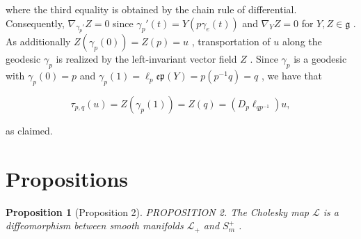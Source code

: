 \documentclass[11pt]{article}
\newtheorem{proposition}{Proposition}
\begin{document}
where the third equality is obtained by the chain rule of differential. Consequently,  $\nabla_{\gamma_p'}Z = 0$  since  $\gamma_p'(t) = Y(p\gamma_e(t))$  and  $\nabla_Y Z = 0$  for  $Y,Z\in \mathfrak{g}$ . As additionally  $Z(\gamma_p(0)) = Z(p) = u$ , transportation of  $u$  along the geodesic  $\gamma_{p}$  is realized by the left-invariant vector field  $Z$ . Since  $\gamma_{p}$  is a geodesic with  $\gamma_p(0) = p$  and  $\gamma_p(1) = \ell_p\mathfrak{e}\mathfrak{p}(Y) = p(p^{-1}q) = q$ , we have that

$$
\tau_ {p, q} (u) = Z \left(\gamma_ {p} (1)\right) = Z (q) = \left(D _ {p} \ell_ {q p ^ {- 1}}\right) u,
$$

as claimed.


\section*{Propositions}

\begin{proposition}[Proposition 2]
PROPOSITION 2. The Cholesky map  $\mathcal{L}$  is a diffeomorphism between smooth manifolds  $\mathcal{L}_{+}$  and  $S_{m}^{+}$ .
\end{proposition}
\end{document}

